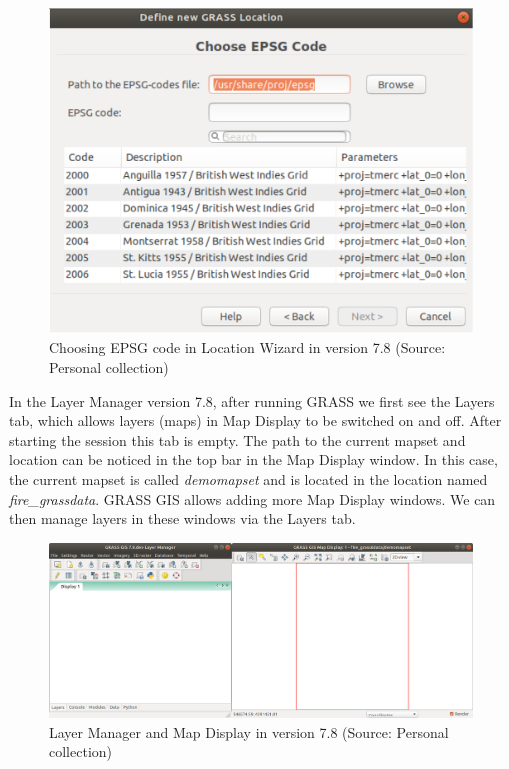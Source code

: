 \documentclass[a4paper,10pt,twoside]{article}
\begin{document}
\vspace{0.3cm}
\begin{figure}[hbt!]
\begin{center}
\includegraphics[width=11.5cm]{../pictures/loc_wizard_sour_pred.png} 
\caption[Choosing EPSG code in Location Wizard in version 7.8]{Choosing EPSG code in Location Wizard in version 7.8 (Source: Personal collection)}
\label{fig:loc_wizard_sour_pred}
\end{center}
\end{figure}

\noindent  In the Layer Manager version 7.8, after
running GRASS we first see the Layers tab, which allows layers (maps) in Map
Display to be switched on and off. After starting the session this tab
is empty. The path to the current mapset and location can be noticed
in the top bar in the Map Display window. In this case, the current
mapset is called \textit{demomapset} and is located in the location named
\textit{fire\_grassdata}. GRASS GIS allows adding more Map Display
windows. We can then manage layers in these windows via the Layers
tab.

\vspace{0.3cm}
\begin{figure}[hbt!] 
\begin{center}
  \includegraphics[width=17cm]{../pictures/empty_layers1.png}
\caption[Layer Manager and Map Display in version 7.8]{Layer Manager and Map Display in version 7.8 (Source: Personal collection)}
\label{fig:empty_layers1}
\end{center}
\end{figure}
\end{document}
